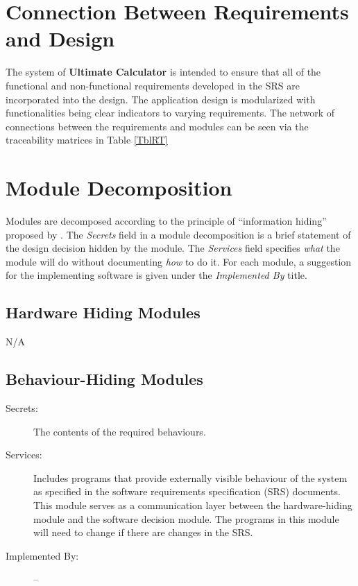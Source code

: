 \documentclass[12pt, titlepage]{article}
\begin{document}
\section{Connection Between Requirements and Design} \label{SecConnection}
The system of \textbf{Ultimate Calculator} is intended to ensure that all of the functional and non-functional requirements developed in the SRS are incorporated into the design. The application design is modularized with functionalities being clear indicators to varying requirements. The network of connections between the requirements and modules can be seen via the traceability matrices in Table \ref{TblRT}

\section{Module Decomposition} \label{SecMD}

Modules are decomposed according to the principle of ``information hiding''
proposed by \citet{ParnasEtAl1984}. The \emph{Secrets} field in a module
decomposition is a brief statement of the design decision hidden by the
module. The \emph{Services} field specifies \emph{what} the module will do
without documenting \emph{how} to do it. For each module, a suggestion for the
implementing software is given under the \emph{Implemented By} title.

\subsection{Hardware Hiding Modules}

N/A

\subsection{Behaviour-Hiding Modules}

\begin{description}
\item[Secrets:]The contents of the required behaviours.
\item[Services:]Includes programs that provide externally visible behaviour of
  the system as specified in the software requirements specification (SRS)
  documents. This module serves as a communication layer between the
  hardware-hiding module and the software decision module. The programs in this
  module will need to change if there are changes in the SRS.
\item[Implemented By:] --
\end{description}
\end{document}

